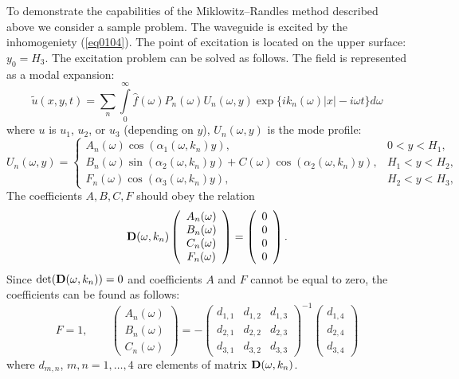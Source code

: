 \documentclass[12pt]{article}
\renewcommand{\i}{i}
\begin{document}
To demonstrate the capabilities of the Miklowitz--Randles method described above we consider a sample 
problem. The waveguide  is excited 
by the inhomogeniety (\ref{eq0104}). The point of excitation is located on the upper surface:
$y_0 = H_3$.    
The excitation  problem can be solved as follows. 
The field 
is represented as a modal expansion: 
\begin{equation}
\tilde u (x, y, t) = \sum_n \int \limits_0^{\infty} 
\hat f (\omega) P_n (\omega) U_n(\omega, y) 
\exp \{ \i k_n (\omega) |x| - \i \omega t \}   
d \omega
\label{eq0401}
\end{equation}
where $u$ is $u_1$, $u_2$, or $u_3$ (depending on $y$),  $U_n(\omega , y)$ is the mode profile:
\[
U_n (\omega , y) = 
\left\{ \begin{array}{ll} 
A_n(\omega) \cos(\alpha_1 (\omega, k_n) y) , & 
0< y < H_1, 
\\ 
B_n(\omega) \sin(\alpha_2 (\omega ,k_n) y) + C(\omega) \cos(\alpha_2 (\omega, k_n) y) , & 
H_1< y < H_2 , 
\\ 
F_n(\omega) \cos(\alpha_3 (\omega, k_n) y) , & 
H_2 < y < H_3, 
\end{array} \right. 
\]
The coefficients $A, B, C, F$ should obey the relation 
\begin{equation}
{\bf D}(\omega , k_n) \left( \begin{array}{c}
A_n(\omega) \\ B_n(\omega) \\ C_n(\omega) \\ F_n(\omega)
\end{array} \right) 
=
 \left( \begin{array}{c}
0 \\ 0 \\ 0 \\ 0
\end{array} \right).
\label{eq0402}
\end{equation}
Since ${\rm det}({\bf D}(\omega , k_n)) = 0$ and coefficients $A$ and $F$ cannot be equal to zero, 
the coefficients can be found as follows: 
\begin{equation}
F = 1, 
\qquad 
\left(  \begin{array}{c}
A_n(\omega) \\ B_n(\omega) \\ C_n(\omega)
\end{array} \right)
=
-
\left(  \begin{array}{ccc} 
d_{1,1} & d_{1,2} & d_{1,3} \\
d_{2,1} & d_{2,2} & d_{2,3} \\
d_{3,1} & d_{3,2} & d_{3,3} 
\end{array} \right)^{-1} 
\left(  \begin{array}{c}
d_{1,4} \\
d_{2,4} \\
d_{3,4}
\end{array} \right)
\label{eq0403}
\end{equation}
where $d_{m,n}$, $m,n = 1,\dots,4$ are elements of matrix ${\bf D} (\omega , k_n)$. 
\end{document}
